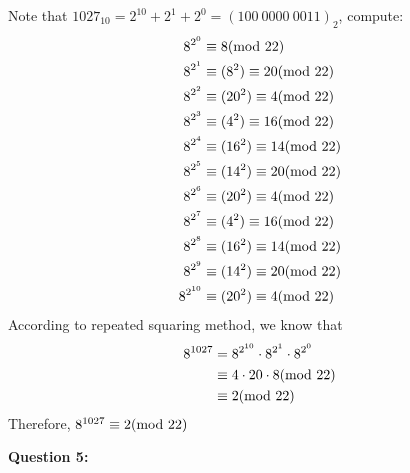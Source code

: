 \documentclass[a4paper,11pt]{article}
\begin{document}
\begin{spacing}{1.4}
    Note that $1027_{10}=2^{10}+2^1+2^0=(100\ 0000\ 0011)_2$,
    compute:
    \begin{align*}
        8^{2^0}&\equiv 8 {\rm (mod\ 22)}\\
        8^{2^1}&\equiv (8^2)\equiv 20 {\rm (mod\ 22)}\\
        8^{2^2}&\equiv (20^2)\equiv 4 {\rm (mod\ 22)}\\
        8^{2^3}&\equiv (4^2)\equiv 16 {\rm (mod\ 22)}\\
        8^{2^4}&\equiv (16^2)\equiv 14 {\rm (mod\ 22)}\\
        8^{2^5}&\equiv (14^2)\equiv 20 {\rm (mod\ 22)}\\
        8^{2^6}&\equiv (20^2)\equiv 4 {\rm (mod\ 22)}\\
        8^{2^7}&\equiv (4^2)\equiv 16 {\rm (mod\ 22)}\\
        8^{2^8}&\equiv (16^2)\equiv 14 {\rm (mod\ 22)}\\
        8^{2^9}&\equiv (14^2)\equiv 20 {\rm (mod\ 22)}\\
        8^{2^{10}}&\equiv (20^2)\equiv 4 {\rm (mod\ 22)}\\
    \end{align*}
    According to repeated squaring method, we know that
    \begin{align*}
        8^{1027}&=8^{2^{10}}\cdot 8^{2^1}\cdot 8^{2^0}\\
        &\equiv 4\cdot 20\cdot 8 {\rm (mod\ 22)}\\
        &\equiv 2 {\rm (mod\ 22)}
    \end{align*}
    Therefore, $8^{1027}\equiv 2 {\rm (mod\ 22)}$
    

    \vspace{20pt}

    \textbf{Question 5:}
    

    \end{spacing}
\end{document}
